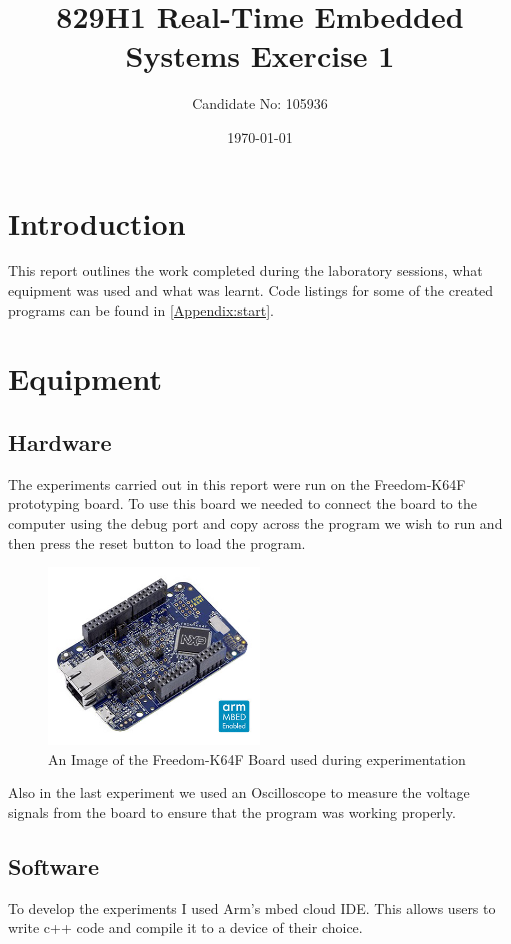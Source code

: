 \documentclass[a4paper,12pt]{scrartcl}
\title{829H1 Real-Time Embedded Systems Exercise 1}
\author{Candidate No: 105936}
\date{\today}
\begin{document}
	
	\begin{titlepage}
		\maketitle
	\end{titlepage}
	
	\tableofcontents
	\newpage
	
	\section{Introduction}
	{
		This report outlines the work completed during the laboratory sessions, what equipment was used and what was learnt. Code listings for some of the created programs can be found in \cref{Appendix:start}.
	}

	\section{Equipment}
	{
		\subsection{Hardware}{
			The experiments carried out in this report were run on the Freedom-K64F prototyping board\cite{nxpproducts2014}. To use this board we needed to connect the board to the computer using the debug port and copy across the program we wish to run and then press the reset button to load the program.
			\begin{figure}[h]
				\centering
				\includegraphics[width=0.5\textwidth]{FRDM-K64F-ANGLE}
				\caption{An Image of the Freedom-K64F Board used during experimentation\cite{nxpproducts2014}}
				\label{img:FRDM-K64F}
			\end{figure}
			Also in the last experiment we used an Oscilloscope to measure the voltage signals from the board to ensure that the program was working properly.
		}
		\subsection{Software}
		{
			To develop the experiments I used Arm's mbed cloud IDE. This allows users to write c++ code and compile it to a device of their choice. 
		}
	}
	
\end{document}
